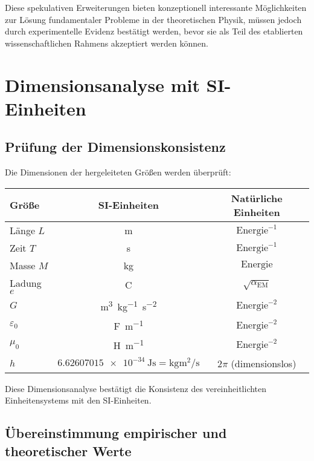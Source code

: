 \documentclass[12pt,a4paper]{article}
\newcommand{\alphaEM}{\alpha_{\text{EM}}}
\begin{document}
	Diese spekulativen Erweiterungen bieten konzeptionell interessante Möglichkeiten zur Lösung fundamentaler Probleme in der theoretischen Physik, müssen jedoch durch experimentelle Evidenz bestätigt werden, bevor sie als Teil des etablierten wissenschaftlichen Rahmens akzeptiert werden können.
	
	\section{Dimensionsanalyse mit SI-Einheiten}
	
	\subsection{Prüfung der Dimensionskonsistenz}
	
	Die Dimensionen der hergeleiteten Größen werden überprüft:
	
	\begin{center}
		\begin{tabular}{lcc}
			\toprule
			\textbf{Größe} & \textbf{SI-Einheiten} & \textbf{Natürliche Einheiten} \\
			\midrule
			Länge \(L\) & \si{\meter} & \(\text{Energie}^{-1}\) \\
			Zeit \(T\) & \si{\second} & \(\text{Energie}^{-1}\) \\
			Masse \(M\) & \si{\kilo\gram} & \(\text{Energie}\) \\
			Ladung \(e\) & \si{\coulomb} & \(\sqrt{\alphaEM}\) \\
			\(G\) & \si{\meter^3\kilo\gram^{-1}\second^{-2}} & \(\text{Energie}^{-2}\) \\
			\(\varepsilon_0\) & \si{\farad\per\meter} & \(\text{Energie}^{-2}\) \\
			\(\mu_0\) & \si{\henry\per\meter} & \(\text{Energie}^{-2}\) \\
			\(h\) & \(\SI{6.62607015e-34}{\joule\second} = \si{\kilo\gram \meter\squared\per\second}\) & \(2\pi\) (dimensionslos) \\
			\bottomrule
		\end{tabular}
	\end{center}
	
	Diese Dimensionsanalyse bestätigt die Konsistenz des vereinheitlichten Einheitensystems mit den SI-Einheiten.
	
	\subsection{Übereinstimmung empirischer und theoretischer Werte}
	
\end{document}

